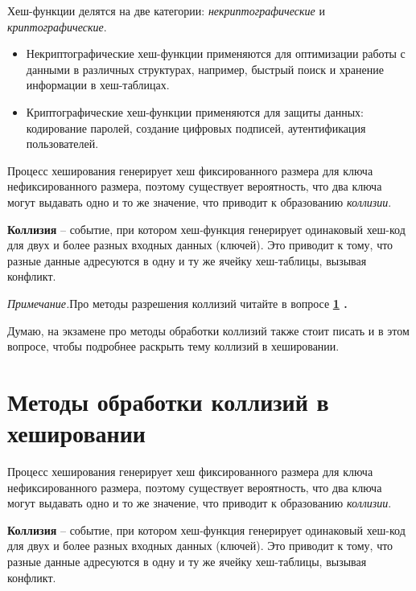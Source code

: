 Хеш-функции делятся на две категории: \textit{некриптографические} и \textit{криптографические}.
\begin{itemize}[label=$\triangleright$, font=\scriptsize, noitemsep, topsep=0pt, , partopsep=0pt]
	\item {\footnotesize Некриптографические хеш-функции применяются для оптимизации работы с данными в различных структурах, например, быстрый поиск и хранение информации в хеш-таблицах.}
	\item {\footnotesize Криптографические хеш-функции применяются для защиты данных: кодирование паролей, создание цифровых подписей, аутентификация пользователей.}
\end{itemize}
\vspace{10pt}

Процесс хеширования генерирует хеш фиксированного размера для ключа нефиксированного размера, поэтому существует вероятность, что два ключа могут выдавать одно и то же значение, что приводит к образованию \textit{коллизии}.\par
\textbf{Коллизия} -- событие, при котором хеш-функция генерирует одинаковый хеш-код для двух и более разных входных данных (ключей). Это приводит к тому, что разные данные адресуются в одну и ту же ячейку хеш-таблицы, вызывая конфликт. 
\vspace{5pt}

{\footnotesize \textit{Примечание.}Про методы разрешения коллизий читайте в вопросе \textbf{\ref{sec:collision-handling} .}\par
Думаю, на экзамене про методы обработки коллизий также стоит писать и в этом вопросе, чтобы подробнее раскрыть тему коллизий в хешировании.}
\vspace{50pt}



\section{Методы обработки коллизий в хешировании} \label{sec:collision-handling} 

Процесс хеширования генерирует хеш фиксированного размера для ключа нефиксированного размера, поэтому существует вероятность, что два ключа могут выдавать одно и то же значение, что приводит к образованию \textit{коллизии}.\par
\textbf{Коллизия} -- событие, при котором хеш-функция генерирует одинаковый хеш-код для двух и более разных входных данных (ключей). Это приводит к тому, что разные данные адресуются в одну и ту же ячейку хеш-таблицы, вызывая конфликт. 
\vspace{5pt}

